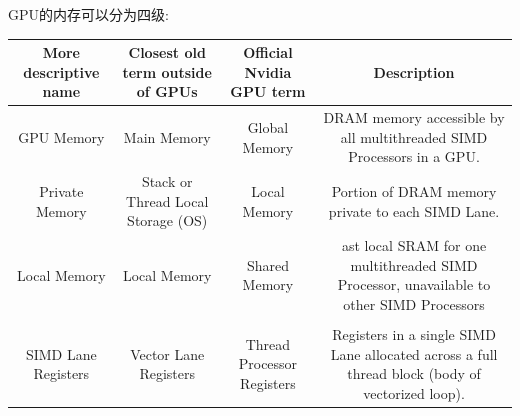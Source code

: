 \documentclass[UTF8]{ctexart}
\begin{document}
GPU的内存可以分为四级:
\begin{center}
  \begin{tabular}{|c c c c|} 
    \hline
    More descriptive name & Closest old term outside of GPUs & Official Nvidia GPU term & Description \\ [0.5ex] 
    \hline\hline
    GPU Memory & Main Memory & Global Memory & DRAM memory accessible by all multithreaded SIMD Processors in a GPU.\\
    \hline
    Private Memory & Stack or Thread Local Storage (OS) & Local Memory & Portion of DRAM memory private to each SIMD Lane.\\
    \hline
    Local Memory & Local Memory & Shared Memory & ast local SRAM for one multithreaded SIMD Processor, unavailable to other SIMD Processors\\
    \hline
    \\SIMD Lane Registers & Vector Lane Registers & Thread Processor Registers & Registers in a single SIMD Lane allocated across a full thread block (body of vectorized loop).\\
    \hline
  \end{tabular}
\end{center}








\end{document}
